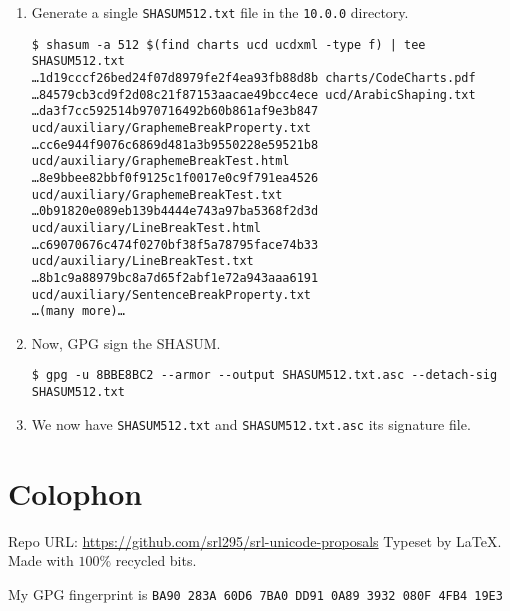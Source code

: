 \documentclass[12pt]{article}
\begin{document}
\begin{enumerate}

\item Generate a single {\tt SHASUM512.txt} file in the {\tt 10.0.0} directory.

\begin{verbatim}
$ shasum -a 512 $(find charts ucd ucdxml -type f) | tee SHASUM512.txt
…1d19cccf26bed24f07d8979fe2f4ea93fb88d8b charts/CodeCharts.pdf
…84579cb3cd9f2d08c21f87153aacae49bcc4ece ucd/ArabicShaping.txt
…da3f7cc592514b970716492b60b861af9e3b847 ucd/auxiliary/GraphemeBreakProperty.txt
…cc6e944f9076c6869d481a3b9550228e59521b8 ucd/auxiliary/GraphemeBreakTest.html
…8e9bbee82bbf0f9125c1f0017e0c9f791ea4526 ucd/auxiliary/GraphemeBreakTest.txt
…0b91820e089eb139b4444e743a97ba5368f2d3d ucd/auxiliary/LineBreakTest.html
…c69070676c474f0270bf38f5a78795face74b33 ucd/auxiliary/LineBreakTest.txt
…8b1c9a88979bc8a7d65f2abf1e72a943aaa6191 ucd/auxiliary/SentenceBreakProperty.txt
…(many more)…
\end{verbatim}

\item Now, GPG sign the SHASUM.

\begin{verbatim}
$ gpg -u 8BBE8BC2 --armor --output SHASUM512.txt.asc --detach-sig SHASUM512.txt
\end{verbatim}

\item We now have {\tt SHASUM512.txt} and {\tt SHASUM512.txt.asc} its signature file.
\end{enumerate}



{}
\printbibliography
\section*{Colophon}

Repo URL: \small\url{https://github.com/srl295/srl-unicode-proposals} 
Typeset by \LaTeX . Made with \( 100\%  \) recycled bits.

My GPG fingerprint is {\tt BA90 283A 60D6 7BA0 DD91  0A89 3932 080F 4FB4 19E3}
\end{document}
